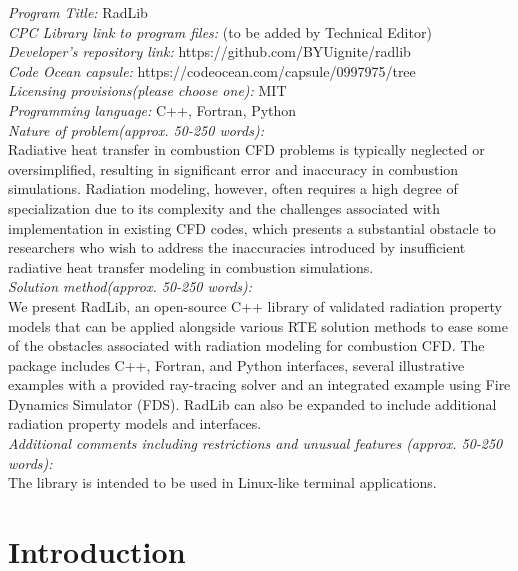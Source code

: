 \documentclass[preprint,12pt]{elsarticle}
\begin{document}
\begin{small}
\noindent
{\em Program Title:} RadLib                                         \\
{\em CPC Library link to program files:} (to be added by Technical Editor) \\
{\em Developer's repository link:} https://github.com/BYUignite/radlib \\
{\em Code Ocean capsule:} https://codeocean.com/capsule/0997975/tree \\
{\em Licensing provisions(please choose one):} MIT \\
{\em Programming language:} C++, Fortran, Python \\
{\em Nature of problem(approx. 50-250 words):} \\
Radiative heat transfer in combustion CFD problems is typically neglected or oversimplified, resulting in significant error and inaccuracy in combustion simulations. Radiation modeling, however, often requires a high degree of specialization due to its complexity and the challenges associated with implementation in existing CFD codes, which presents a substantial obstacle to researchers who wish to address the inaccuracies introduced by insufficient radiative heat transfer modeling in combustion simulations. \\
{\em Solution method(approx. 50-250 words):}\\
We present RadLib, an open-source C++ library of validated radiation property models that can be applied alongside various RTE solution methods to ease some of the obstacles associated with radiation modeling for combustion CFD. The package includes C++, Fortran, and Python interfaces, several illustrative examples with a provided ray-tracing solver and an integrated example using Fire Dynamics Simulator (FDS). RadLib can also be expanded to include additional radiation property models and interfaces.\\
{\em Additional comments including restrictions and unusual features (approx. 50-250 words):}\\
The library is intended to be used in Linux-like terminal applications.
    \\

\end{small}


\section{Introduction} \label{s:intro}
\end{document}

